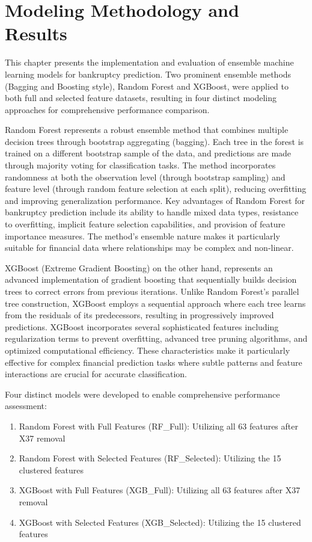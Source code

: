 \chapter{Modeling Methodology and Results}

This chapter presents the implementation and evaluation of ensemble machine learning models for bankruptcy prediction. Two prominent ensemble methods (Bagging and Boosting style), Random Forest and XGBoost, were applied to both full and selected feature datasets, resulting in four distinct modeling approaches for comprehensive performance comparison.

Random Forest represents a robust ensemble method that combines multiple decision trees through bootstrap aggregating (bagging). Each tree in the forest is trained on a different bootstrap sample of the data, and predictions are made through majority voting for classification tasks. The method incorporates randomness at both the observation level (through bootstrap sampling) and feature level (through random feature selection at each split), reducing overfitting and improving generalization performance.
Key advantages of Random Forest for bankruptcy prediction include its ability to handle mixed data types, resistance to overfitting, implicit feature selection capabilities, and provision of feature importance measures. The method's ensemble nature makes it particularly suitable for financial data where relationships may be complex and non-linear.

XGBoost (Extreme Gradient Boosting) on the other hand, represents an advanced implementation of gradient boosting that sequentially builds decision trees to correct errors from previous iterations. Unlike Random Forest's parallel tree construction, XGBoost employs a sequential approach where each tree learns from the residuals of its predecessors, resulting in progressively improved predictions.
XGBoost incorporates several sophisticated features including regularization terms to prevent overfitting, advanced tree pruning algorithms, and optimized computational efficiency. These characteristics make it particularly effective for complex financial prediction tasks where subtle patterns and feature interactions are crucial for accurate classification.

Four distinct models were developed to enable comprehensive performance assessment:

\begin{enumerate}
    \item Random Forest with Full Features (RF\_Full): Utilizing all 63 features after X37 removal
    \item Random Forest with Selected Features (RF\_Selected): Utilizing the 15 clustered features
    \item XGBoost with Full Features (XGB\_Full): Utilizing all 63 features after X37 removal
    \item XGBoost with Selected Features (XGB\_Selected): Utilizing the 15 clustered features
\end{enumerate}

